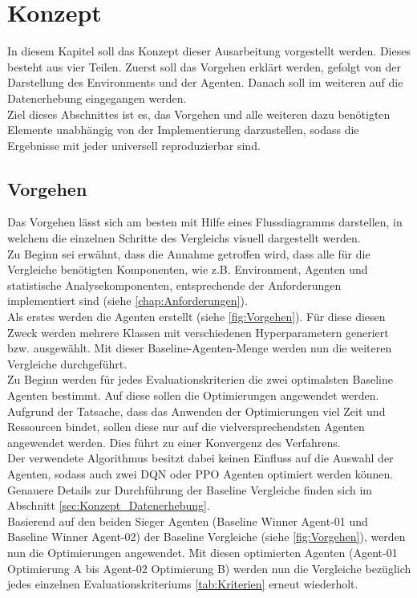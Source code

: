 \chapter{Konzept} \label{chap:Konzept}
In diesem Kapitel soll das Konzept dieser Ausarbeitung vorgestellt werden. Dieses besteht aus vier Teilen. Zuerst soll das Vorgehen erklärt werden, gefolgt von der Darstellung des Environments und der Agenten. Danach soll im weiteren auf die Datenerhebung eingegangen werden.\\
Ziel dieses Abschnittes ist es, das Vorgehen und alle weiteren dazu benötigten Elemente unabhängig von der Implementierung darzustellen, sodass die Ergebnisse mit jeder universell reproduzierbar sind.

\section{Vorgehen} \label{sec:Konzept_Vorgehen}
Das Vorgehen lässt sich am besten mit Hilfe eines Flussdiagramms darstellen, in welchem die einzelnen Schritte des Vergleichs visuell dargestellt werden.\\
Zu Beginn sei erwähnt, dass die Annahme getroffen wird, dass alle für die Vergleiche benötigten Komponenten, wie z.B. Environment, Agenten und statistische Analysekomponenten, entsprechende der Anforderungen implementiert sind (siehe \ref{chap:Anforderungen}).\\
Als erstes werden die Agenten erstellt (siehe \ref{fig:Vorgehen}). Für diese diesen Zweck werden mehrere Klassen mit verschiedenen Hyperparametern generiert bzw. ausgewählt.
Mit dieser Baseline-Agenten-Menge werden nun die weiteren Vergleiche durchgeführt.\\
Zu Beginn werden für jedes Evaluationskriterien die zwei optimalsten Baseline Agenten bestimmt. Auf diese sollen die Optimierungen angewendet werden. 
Aufgrund der Tatsache, dass das Anwenden der Optimierungen viel Zeit und Ressourcen bindet, sollen diese nur auf die vielversprechendsten Agenten angewendet werden. Dies führt zu einer Konvergenz des Verfahrens.\\
Der verwendete Algorithmus besitzt dabei keinen Einfluss auf die Auswahl der Agenten, sodass auch zwei DQN oder PPO Agenten optimiert werden können. Genauere Details zur Durchführung der Baseline Vergleiche finden sich im Abschnitt \ref{sec:Konzept_Datenerhebung}.\\
Basierend auf den beiden Sieger Agenten (Baseline Winner Agent-01 und Baseline Winner Agent-02) der Baseline Vergleiche (siehe \ref{fig:Vorgehen}), werden nun die Optimierungen angewendet. Mit diesen optimierten Agenten (Agent-01 Optimierung A bis Agent-02 Optimierung B) werden nun die Vergleiche bezüglich jedes einzelnen Evaluationskriteriums \ref{tab:Kriterien} erneut wiederholt.\\
